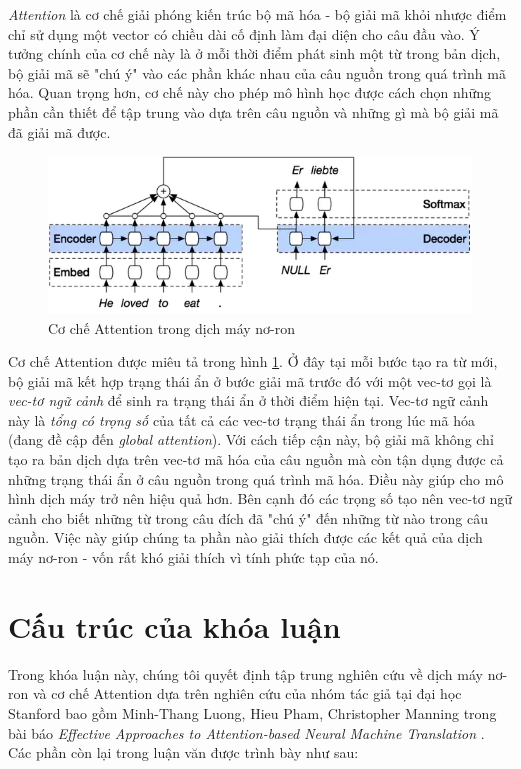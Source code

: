 \textit{Attention} là cơ chế giải phóng kiến trúc bộ mã hóa - bộ giải mã khỏi nhược điểm chỉ sử dụng một vector có chiều dài cố định làm đại diện cho câu đầu vào. Ý tưởng chính của cơ chế này là ở mỗi thời điểm phát sinh một từ trong bản dịch, bộ giải mã sẽ "chú ý" vào các phần khác nhau của câu nguồn trong quá trình mã hóa. Quan trọng hơn, cơ chế này cho phép mô hình học được cách chọn những phần cần thiết để tập trung vào dựa trên câu nguồn và những gì mà bộ giải mã đã giải mã được.

\begin{figure}
	\centering
	\includegraphics[width=\textwidth]{intro2attention}
	\caption[Cơ chế Attention trong dịch máy nơ-ron]{Cơ chế Attention trong dịch máy nơ-ron}
	\label{fig_introattention}
\end{figure}

Cơ chế Attention được miêu tả trong hình \ref{fig_introattention}. Ở đây tại mỗi bước tạo ra từ mới, bộ giải mã kết hợp trạng thái ẩn ở bước giải mã trước đó với một vec-tơ gọi là \textit{vec-tơ ngữ cảnh} để sinh ra trạng thái ẩn ở thời điểm hiện tại. Vec-tơ ngữ cảnh này là \textit{tổng có trọng số} của tất cả các vec-tơ trạng thái ẩn trong lúc mã hóa (đang đề cập đến \textit{global attention}). Với cách tiếp cận này, bộ giải mã không chỉ tạo ra bản dịch dựa trên vec-tơ mã hóa của câu nguồn mà còn tận dụng được cả những trạng thái ẩn ở câu nguồn trong quá trình mã hóa. Điều này giúp cho mô hình dịch máy trở nên hiệu quả hơn. Bên cạnh đó các trọng số tạo nên vec-tơ ngữ cảnh cho biết những từ trong câu đích đã "chú ý" đến những từ nào trong câu nguồn. Việc này giúp chúng ta phần nào giải thích được các kết quả của dịch máy nơ-ron - vốn rất khó giải thích vì tính phức tạp của nó.

\section{Cấu trúc của khóa luận}
Trong khóa luận này, chúng tôi quyết định tập trung nghiên cứu về dịch máy nơ-ron và cơ chế Attention dựa trên nghiên cứu của nhóm tác giả tại đại học Stanford bao gồm Minh-Thang Luong, Hieu Pham, Christopher Manning trong bài báo \textit{Effective Approaches to Attention-based Neural Machine Translation} \cite{mainpaper}. Các phần còn lại trong luận văn được trình bày như sau:

